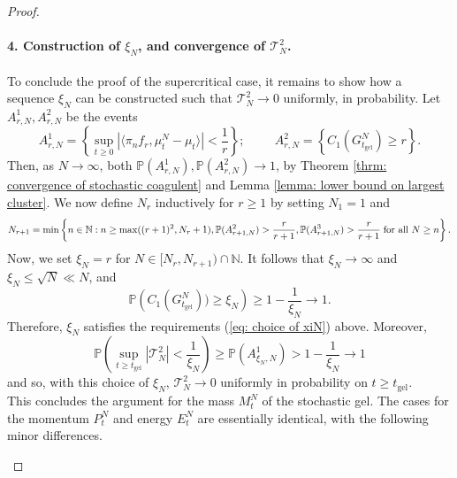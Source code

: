 \begin{proof}
       \paragraph{4. Construction of $\xi_N$, and convergence of $\mathcal{T}^2_N$.} To conclude the proof of the supercritical case, it remains to show how a sequence $\xi_N$ can be constructed such that $\mathcal{T}^2_N \rightarrow 0$ uniformly, in probability. Let $A^1_{r,N}, A^2_{r,N}$ be the events \begin{equation} \label{eq: definition of A1rn}
       A^1_{r,N}=\left\{\sup_{t\geq 0} |\langle \pi_n f_r, \mu^N_t-\mu_t\rangle|<\frac{1}{r}\right\}; \hspace{1cm}
       A^2_{r,N}=\left\{C_1(G^N_{t_\text{gel}}) \geq r\right\}.
   \end{equation} Then, as $N\rightarrow \infty$, both $\mathbb{P}(A^1_{r,N}), \mathbb{P}(A^2_{r,N}) \rightarrow 1$, by Theorem \ref{thrm: convergence of stochastic coagulent} and Lemma \ref{lemma: lower bound on largest cluster}. We now define $N_r$ inductively for $r\geq 1$ by setting $N_1=1$ and \begin{equation}
       \label{eq: recursive definition of Nr} N_{r+1}=\min\left\{n \in \mathbb{N}: n\geq \max((r+1)^2, N_r+1),  \mathbb{P}(A^2_{r+1,N})>\frac{r}{r+1},  \mathbb{P}(A^3_{r+1,N})>\frac{r}{r+1} \hspace{0.1cm} \text{for all }N\geq n \right\}.
   \end{equation} Now, we set $\xi_N=r$ for $N\in [N_r, N_{r+1})\cap\mathbb{N}.$ It follows that $\xi_N \rightarrow \infty$ and $\xi_N\leq \sqrt{N}\ll N$, and \begin{equation}
       \mathbb{P}\left(C_1(G^N_{t_\text{gel}}))\geq \xi_N\right)\ge 1-\frac{1}{\xi_N} \rightarrow 1. 
   \end{equation} Therefore, $\xi_N$ satisfies the requirements (\ref{eq: choice of xiN}) above. Moreover, \begin{equation}
       \mathbb{P}\left(\sup_{t\geq t_\text{gel}} |\mathcal{T}^2_N| <\frac{1}{\xi_N}\right) \ge \mathbb{P}\left(A^1_{\xi_N,N}\right) > 1-\frac{1}{\xi_N}\rightarrow 1
   \end{equation} and so, with this choice of $\xi_N$, $\mathcal{T}^2_N \rightarrow 0$ uniformly in probability on $t\ge t_\text{gel}.$ \bigskip \\ This concludes the argument for the mass $M^N_t$ of the stochastic gel. The cases for the momentum $P^N_t$ and energy $E^N_t$ are essentially identical, with the following minor differences. \begin{enumerate}[label=\roman{*}).]

\end{enumerate}
\end{proof}
